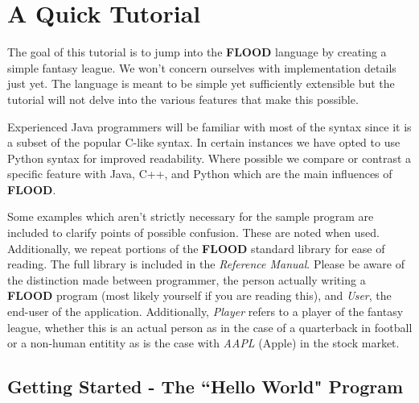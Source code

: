 \documentclass[12pt]{report}
\begin{document}
\chapter{A Quick Tutorial}

\begin{doublespace}
The goal of this tutorial is to jump into the \textbf{FLOOD} language by creating a simple fantasy league. We won't concern ourselves with implementation details just yet. The language is meant to be simple yet sufficiently extensible but the tutorial will not delve into the various features that make this possible. 

Experienced Java programmers will be familiar with most of the syntax since it is a subset of the popular C-like syntax. In certain instances we have opted to use Python syntax for improved readability. Where possible we compare or contrast a specific feature with Java, C++, and Python which are the main influences of \textbf{FLOOD}. 

Some examples which aren't strictly necessary for the sample program are included to clarify points of possible confusion. These are noted when used. Additionally, we repeat portions of the \textbf{FLOOD} standard library for ease of reading. The full library is included in the \textit{Reference Manual}. Please be aware of the distinction made between programmer, the person actually writing a \textbf{FLOOD} program (most likely yourself if you are reading this), and \textit{User}, the end-user of the application. Additionally, \textit{Player} refers to a player of the fantasy league, whether this is an actual person as in the case of a quarterback in football or a non-human entitity as is the case with \textit{AAPL} (Apple) in the stock market.
\end{doublespace}

\section{Getting Started - The ``Hello World" Program}
\end{document}
